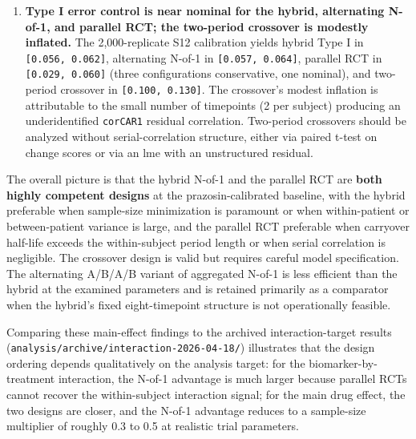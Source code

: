 \documentclass[
  11pt,
]{article}
\begin{document}
\begin{enumerate}
  The hybrid saturates at 1.000 across rho = 0 to 0.9 (S8), while the
  parallel RCT power drops from 0.98 to 0.75 across the same range (S8)
  and Type I error inflates from 0.018 to 0.126 under high-rho DGP (S11
  high-AR1 null cells). This reproduces Wang-Schork
  2019\textsuperscript{} in
  the direction they predicted: within-subject designs with
  \texttt{corCAR1} fitted absorb serial correlation efficiently, while
  between-subject designs with the standard
  random-intercept-plus-corCAR1 specification do not. The practical
  implication for parallel-group trials with expected strong
  autocorrelation is that a more elaborate residual specification
  (subject-specific AR(1), or AR(1) with a between-subject random slope)
  is needed to control Type I error.
\item
  \textbf{Type I error control is near nominal for the hybrid,
  alternating N-of-1, and parallel RCT; the two-period crossover is
  modestly inflated.} The 2,000-replicate S12 calibration yields hybrid
  Type I in \texttt{{[}0.056,\ 0.062{]}}, alternating N-of-1 in
  \texttt{{[}0.057,\ 0.064{]}}, parallel RCT in
  \texttt{{[}0.029,\ 0.060{]}} (three configurations conservative, one
  nominal), and two-period crossover in \texttt{{[}0.100,\ 0.130{]}}.
  The crossover's modest inflation is attributable to the small number
  of timepoints (2 per subject) producing an underidentified
  \texttt{corCAR1} residual correlation. Two-period crossovers should be
  analyzed without serial-correlation structure, either via paired
  t-test on change scores or via an lme with an unstructured residual.
\end{enumerate}

The overall picture is that the hybrid N-of-1 and the parallel RCT are
\textbf{both highly competent designs} at the prazosin-calibrated
baseline, with the hybrid preferable when sample-size minimization is
paramount or when within-patient or between-patient variance is large,
and the parallel RCT preferable when carryover half-life exceeds the
within-subject period length or when serial correlation is negligible.
The crossover design is valid but requires careful model specification.
The alternating A/B/A/B variant of aggregated N-of-1 is less efficient
than the hybrid at the examined parameters and is retained primarily as
a comparator when the hybrid's fixed eight-timepoint structure is not
operationally feasible.

Comparing these main-effect findings to the archived interaction-target
results (\texttt{analysis/archive/interaction-2026-04-18/}) illustrates
that the design ordering depends qualitatively on the analysis target:
for the biomarker-by-treatment interaction, the N-of-1 advantage is much
larger because parallel RCTs cannot recover the within-subject
interaction signal; for the main drug effect, the two designs are
closer, and the N-of-1 advantage reduces to a sample-size multiplier of
roughly 0.3 to 0.5 at realistic trial parameters.
\end{document}

